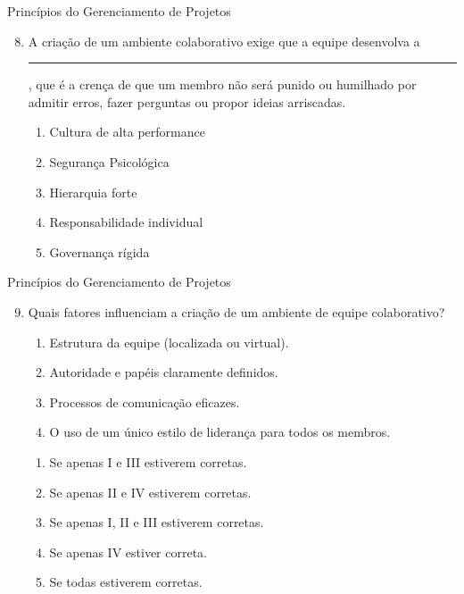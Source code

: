 \documentclass{beamer}
\begin{document}
\begin{frame}{Princípios do Gerenciamento de Projetos}
	\begin{enumerate}
		\setcounter{enumi}{7}
		\justifying
		\item A criação de um ambiente colaborativo exige que a equipe desenvolva a \rule{90pt}{1pt}, que é a crença de que um membro não será punido ou humilhado por admitir erros, fazer perguntas ou propor ideias arriscadas.
		\begin{enumerate}[a]
			\item Cultura de alta performance
			\item \alert<2>{Segurança Psicológica}
			\item Hierarquia forte
			\item Responsabilidade individual
			\item Governança rígida
		\end{enumerate}
	\end{enumerate}
\end{frame}

\begin{frame}{Princípios do Gerenciamento de Projetos}
	\begin{enumerate}
		\setcounter{enumi}{8}
		\justifying
		\item Quais fatores influenciam a criação de um ambiente de equipe colaborativo?
		\begin{enumerate}[I]
			\item Estrutura da equipe (localizada ou virtual).
			\item Autoridade e papéis claramente definidos.
			\item Processos de comunicação eficazes.
			\item O uso de um único estilo de liderança para todos os membros.
		\end{enumerate}
		\begin{enumerate}[a]
			\item Se apenas I e III estiverem corretas.
			\item Se apenas II e IV estiverem corretas.
			\item \alert<2>{Se apenas I, II e III estiverem corretas.}
			\item Se apenas IV estiver correta.
			\item Se todas estiverem corretas.
		\end{enumerate}
	\end{enumerate}
\end{frame}
\end{document}
